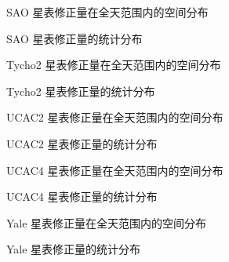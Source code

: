 \documentclass{aastex701}
\begin{document}
\begin{figure}[ht!]
\caption{SAO 星表修正量在全天范围内的空间分布}
\label{fig:bias_sao_2x2}
\end{figure}

\begin{figure}[ht!]
\caption{SAO 星表修正量的统计分布}
\label{fig:hist_sao}
\end{figure}

\begin{figure}[ht!]
\caption{Tycho2 星表修正量在全天范围内的空间分布}
\label{fig:bias_tycho2_2x2}
\end{figure}

\begin{figure}[ht!]
\caption{Tycho2 星表修正量的统计分布}
\label{fig:hist_tycho2}
\end{figure}

\begin{figure}[ht!]
\caption{UCAC2 星表修正量在全天范围内的空间分布}
\label{fig:bias_ucac2_2x2}
\end{figure}

\begin{figure}[ht!]
\caption{UCAC2 星表修正量的统计分布}
\label{fig:hist_ucac2}
\end{figure}

\begin{figure}[ht!]
\caption{UCAC4 星表修正量在全天范围内的空间分布}
\label{fig:bias_ucac4_2x2}
\end{figure}

\begin{figure}[ht!]
\caption{UCAC4 星表修正量的统计分布}
\label{fig:hist_ucac4}
\end{figure}

\begin{figure}[ht!]
\caption{Yale 星表修正量在全天范围内的空间分布}
\label{fig:bias_yale_2x2}
\end{figure}

\begin{figure}[ht!]
\caption{Yale 星表修正量的统计分布}
\label{fig:hist_yale}
\end{figure}
\end{document}
